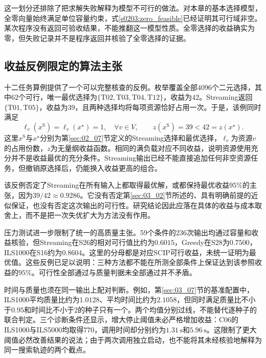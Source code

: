 这一划分还排除了把求解失败解释为模型不可行的做法。对本章的基本选择模型，全零向量始终满足单位容量约束，式\eqref{s0203:zero_feasible}已经证明其可行域非空。某次程序没有返回可验收结果，不能推翻这一模型性质。全零选择的收益确实为零，但失败记录并不是程序返回并核验了全零选择的证据。

\subsection{收益反例限定的算法主张}

十二任务算例提供了一个可以完整核查的反例。枚举覆盖全部$4096$个二元选择，其中$62$个可行，唯一最优选择为$\{\mathrm{T02},\mathrm{T03},\mathrm{T04},\mathrm{T12}\}$，收益为$42$。Streaming返回$\{\mathrm{T01},\mathrm{T05}\}$，收益为$39$，且两种选择均将每项资源恰好占用一次。于是，该例同时满足
\begin{equation}
 \ell_v(x^{\mathrm S})=\ell_v(x^\star)=1,
 \quad\forall v\in V,
 \qquad
 z(x^{\mathrm S})=39<42=z(x^\star).
 \label{s0308:full_load_counterexample}
\end{equation}
这里$x^{\mathrm S}$与$x^\star$分别为第\ref{sec:02_07}节定义的Streaming选择和最优选择，$\ell_v$为资源$v$的占用份数，$z$为无量纲收益函数。相同的满负载对应不同收益，说明资源使用充分并不是收益最优的充分条件。Streaming输出已经不能直接追加任何非空资源任务，但撤销原选择后，仍能换入收益更高的组合。

该反例否定了Streaming在所有输入上都取得最优解，或都保持最优收益$95\%$的主张，因为$39/42\approx0.9286$。它没有否定第\ref{sec:03_02}节所述的、具有明确前提的近似保证\cite{ReinstadtlerFPU2025}，也没有否定这次输出的可行性。研究结论因此应落在具体的收益与成本取舍上，而不是把一次失优扩大为方法没有作用。

压力测试进一步限制了统一的高质量主张。59个条件的236次输出均通过容量和收益核验，但Streaming在S26的相对可行值比约为$0.6015$，Greedy在S28为$0.7500$，ILS1000在S16约为$0.8604$。这里的分母都是对应SCIP可行收益，未统一证明为最优值。这些反例已足以说明：三种方法都不能在所测全部条件上保证达到该参照收益的$95\%$。可行性全部通过与质量判据未全部通过并不矛盾。

时间与质量也须在同一输出上配对判断。例如，第\ref{sec:03_07}节的基准配置中，ILS1000平均质量比约为$1.0128$、平均时间比约为$2.1058$，但同时满足质量比不小于$0.95$和时间比不小于$2$的种子只有一个。两个均值分别过线，不能替代逐种子的联合判定。三个诊断条件还显示，增大停止阈值未必严格增加收益：C06的ILS1000与ILS5000均取得$770$，调用时间却分别约为$1.31\,\mathrm{s}$和$5.96\,\mathrm{s}$。这限制了更大阈值必然改善结果的说法；由于两次调用独立启动，也不能将其未经核验地解释为同一搜索轨迹的两个截点。

